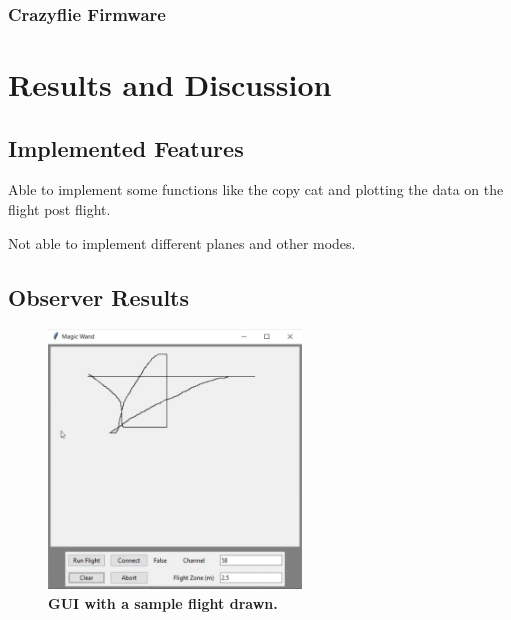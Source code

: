 \documentclass[conf]{new-aiaa}
\begin{document}
        \subsubsection{Crazyflie Firmware}

\section{Results and Discussion}

    \subsection{Implemented Features}
        Able to implement some functions like the copy cat and plotting the data on the flight post flight. 
        
        Not able to implement different planes and other modes. 
        
    
    \subsection{Observer Results}

        \begin{figure}[H]
        \centering
        \includegraphics[width=0.6\textwidth]{docs/reports/Final Project Update/images/drawn_flight_path.PNG}
        \caption{\textbf{GUI with a sample flight drawn.}}
        \label{fig:drawn_flight}
        \end{figure}
        
\end{document}
